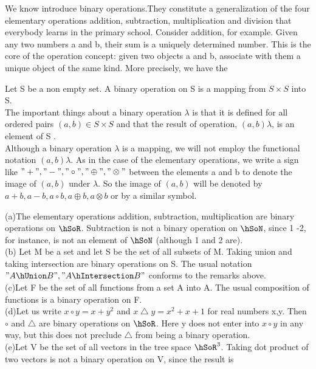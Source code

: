 \documentclass[11pt]{amsbook}
\begin{document}
We know introduce binary operations.They constitute a generalization of the four elementary operations addition, subtraction, multiplication and
division that everybody learns in the primary school. Consider addition, for example. Given any two numbers a and b, their sum is a uniquely determined number. This is the core of the operation concept: given two
objects a and b, associate with them a unique object of the same kind. More precisely, we have the 
\begin{defn}
    Let S  be a non empty set. A binary operation on S is a mapping from $ S \times S $ into S. \\
    The important things about a binary operation $ \lambda$
    is that it is defined for all ordered pairs $ \left( a,b \right ) \in  S \times S $ and that the result of operation, $ (a,b)\lambda$, is an element of S . \\
    Although a binary operation $ \lambda$ is a mapping, we will not employ the functional notation $(a,b)\lambda $.
    As in the case of the elementary operations, we write a sign like $ "+","-","\circ","\oplus","\otimes"$ between the elements a and b to denote the image of $(a,b)$ under $\lambda$. So the image of $(a,b)$ will be denoted
    by $a+b,a-b,a\circ b, a \oplus b, a \otimes b$ or by a similar symbol.
\end{defn}
\begin{exmp}
(a)The elementary operations addition, subtraction, multiplication are binary operations on $\hSoR$. Subtraction is not a binary operation on  $\hSoN$, since 1 -2, for instance, is not an element of  $\hSoN$ (although 1 and 2 are).\\
(b) Let M be a set and let S be the set of all subsets of M. Taking union and taking intersection are binary operations on S. The usual notation $" A \hUnion B ", " A \hIntersection B" $ conforms to the remarks above. \\
(c)Let F be the set of all functions from a set A into A. The usual composition of functions is a binary operation on F. \\
(d)Let us write $x \circ y = x + y^2 $ and $ x \bigtriangleup y = x^2+x+1$ for real numbers x,y. Then
$\circ$ and $\bigtriangleup$ are binary operations on $\hSoR$. Here y does not enter into $x \circ y $ in any way, but this does not preclude $\bigtriangleup$ from being a binary operation. \\
(e)Let V be the set of all vectors in the tree space 
$\hSoR^3$. Taking dot product of two vectors is not a binary operation on V, since the result is 
\end{exmp}
\end{document}

